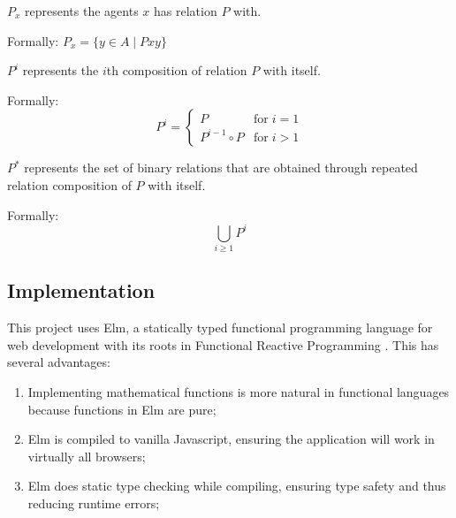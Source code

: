 \begin{subdefinition}
    \(P_x\) represents the agents \(x\) has relation \(P\) with.

    Formally: \(P_x = \{ y \in A \mid Pxy \}\)
    \label{def:rel-acq} %
\end{subdefinition}

\begin{subdefinition}
    \(P^i\) represents the \(i\)th composition of relation \(P\) with itself.

    Formally: 
    \[
        P^i = 
        \begin{cases}
            P               & \text{for} \; i = 1\\
            P^{i-1} \circ P & \text{for} \; i > 1
        \end{cases}
    \]
    \label{def:rel-icomp}
\end{subdefinition}

\begin{subdefinition}
    \(P^*\) represents the set of binary relations that are obtained through repeated relation composition of \(P\) with itself.

    Formally:
    \[
        \bigcup_{i \geq 1} P^i
    \]
    \label{def:rel-star} %
\end{subdefinition}


\subsection{Implementation}

This project uses Elm, a statically typed functional programming language for web development with its roots in Functional Reactive Programming \parencite{czaplicki_asynchronous_2013}.
This has several advantages:

\begin{enumerate}
    \item Implementing mathematical functions is more natural in functional languages because functions in Elm are pure;
    \item Elm is compiled to vanilla Javascript, ensuring the application will work in virtually all browsers;
    \item Elm does static type checking while compiling, ensuring type safety and thus reducing runtime errors;
\end{enumerate}

